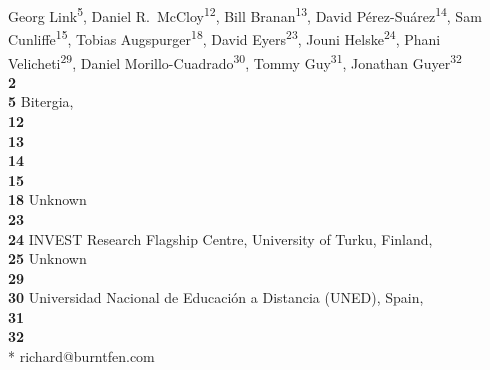 Georg Link\textsuperscript{5},
Daniel R.\ McCloy\textsuperscript{12},
Bill Branan\textsuperscript{13},
David Pérez-Suárez\textsuperscript{14},
Sam Cunliffe\textsuperscript{15},
Tobias Augspurger\textsuperscript{18},
David Eyers\textsuperscript{23}, %
Jouni Helske\textsuperscript{24},
Phani Velicheti\textsuperscript{29},
Daniel Morillo-Cuadrado\textsuperscript{30},
Tommy Guy\textsuperscript{31},
Jonathan Guyer\textsuperscript{32}
\\
\bigskip
\textbf{2} \\
\textbf{5} Bitergia, \\
\textbf{12} \\
\textbf{13} \\
\textbf{14} \\
\textbf{15} \\
\textbf{18} Unknown\\
\textbf{23} \\
\textbf{24} INVEST Research Flagship Centre, University of Turku, Finland, \\
\textbf{25} Unknown\\
\textbf{29} \\
\textbf{30} Universidad Nacional de Educación a Distancia (UNED), Spain, \\
\textbf{31} \\
\textbf{32} \\

* richard@burntfen.com
